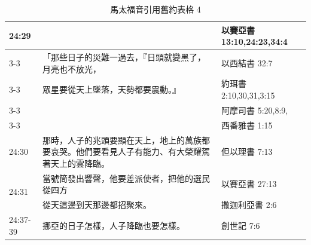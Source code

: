 \begin{table}[htbp]
\begin{tabular}{|p{4.2em}|p{31.645em}|p{7.3em}|}
    \midrule
    \multirow{5}[10]{*}{24:29} & \multicolumn{1}{r|}{} & 以賽亞書 13:10,24:23,34:4 \\
\cmidrule{3-3}    \multicolumn{1}{|l|}{} & 「那些日子的災難一過去，『日頭就變黑了，月亮也不放光， & 以西結書 32:7 \\
\cmidrule{3-3}    \multicolumn{1}{|l|}{} & 眾星要從天上墜落，天勢都要震動。』 & 約珥書 2:10,30,31,3:15 \\
\cmidrule{3-3}    \multicolumn{1}{|l|}{} & \multicolumn{1}{r|}{} & 阿摩司書 5:20,8:9, \\
\cmidrule{3-3}    \multicolumn{1}{|l|}{} & \multicolumn{1}{r|}{} & 西番雅書 1:15 \\
    \midrule
    24:30 & 那時，人子的兆頭要顯在天上，地上的萬族都要哀哭。他們要看見人子有能力、有大榮耀駕著天上的雲降臨。 & 但以理書 7:13 \\
    \midrule
    \multirow{2}[4]{*}{24:31} & 當號筒發出響聲，他要差派使者，把他的選民從四方 & 以賽亞書 27:13 \\
\cmidrule{3-3}    \multicolumn{1}{|l|}{} & 從天這邊到天那邊都招聚來。 & 撒迦利亞書 2:6 \\
    \midrule
    24:37-39 & 挪亞的日子怎樣，人子降臨也要怎樣。 & 創世記 7:6 \\
    \bottomrule
    \end{tabular}%
  \label{tab:addlabel}%
    \caption{馬太福音引用舊約表格 4} 
\end{table}%

